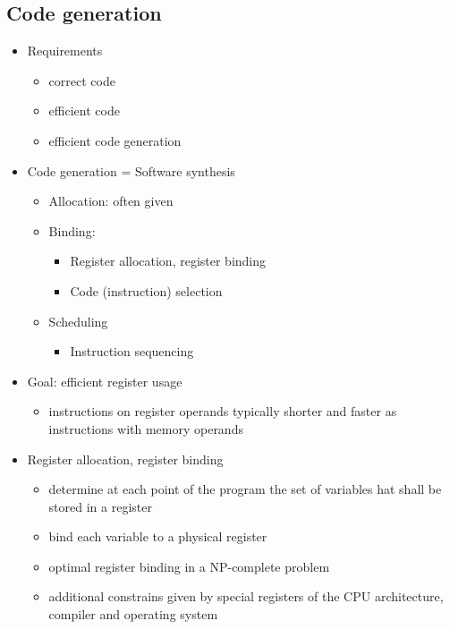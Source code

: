 \subsection{Code generation}
\begin{itemize}
	\item Requirements
\begin{itemize}
	\item correct code
	\item efficient code
	\item efficient code generation
\end{itemize}
\item Code generation = Software synthesis
\begin{itemize}
	\item Allocation: often given
	\item Binding:
\begin{itemize}
	\item Register allocation, register binding
	\item Code (instruction) selection
\end{itemize}
\item Scheduling
\begin{itemize}
	\item Instruction sequencing
\end{itemize} 
\end{itemize}
\item Goal: efficient register usage
\begin{itemize}
	\item instructions on register operands typically shorter and faster as instructions with memory operands
\end{itemize}
\item Register allocation, register binding
\begin{itemize}
	\item determine at each point of the program the set of variables hat shall be stored in a register
	\item bind each variable to a physical register
	\item optimal register binding in a NP-complete problem
	\item additional constrains given by special registers of the CPU architecture, compiler and operating system
\end{itemize}
\end{itemize}

